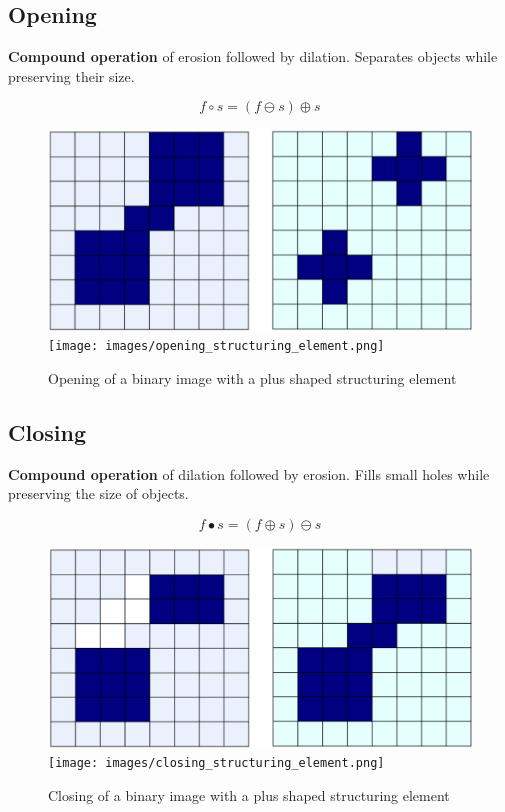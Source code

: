 \subsection*{Opening}

\textbf{Compound operation} of erosion followed by dilation. Separates objects while preserving their size.

\begin{equation*}
  f \circ s = (f \ominus s) \oplus s
\end{equation*}

\begin{figure}[H]
  \centering
  \includegraphics[width=\linewidth]{images/opening.png}
  \texttt{[image: images/opening\_structuring\_element.png]}
  \caption{Opening of a binary image with a plus shaped structuring element}
\end{figure}

\subsection*{Closing}

\textbf{Compound operation} of dilation followed by erosion. Fills small holes while preserving the size of objects.

\begin{equation*}
  f \bullet s = (f \oplus s) \ominus s
\end{equation*}

\begin{figure}[H]
  \centering
  \includegraphics[width=\linewidth]{images/closing.png}
  \texttt{[image: images/closing\_structuring\_element.png]}
  \caption{Closing of a binary image with a plus shaped structuring element}
\end{figure}

